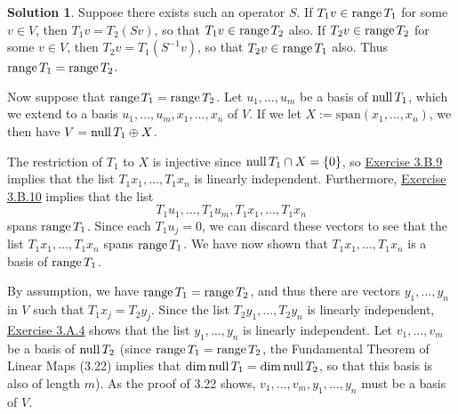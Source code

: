 \documentclass[12pt]{article}
\theoremstyle{definition}
\theoremstyle{exercise}
\theoremstyle{solution}
\newtheorem*{solution}{Solution}
\newcommand{\Span}{\text{span}}
\newcommand{\Null}{\text{null\,}}
\newcommand{\Range}{\text{range\,}}
\begin{document}
\begin{solution}
    Suppose there exists such an operator \( S \). If \( T_1v \in \Range T_1 \) for some \( v \in V \), then \( T_1v = T_2(Sv) \), so that \( T_1v \in \Range T_2 \) also. If \( T_2v \in \Range T_2 \) for some \( v \in V \), then \( T_2v = T_1(S^{-1}v) \), so that \( T_2v \in \Range T_1 \) also. Thus \( \Range T_1 = \Range T_2 \).

    Now suppose that \( \Range T_1 = \Range T_2 \). Let \( u_1, \ldots, u_m \) be a basis of \( \Null T_1 \), which we extend to a basis \( u_1, \ldots, u_m, x_1, \ldots, x_n \) of \( V \). If we let \( X := \Span(x_1, \ldots, x_n) \), we then have \( V = \Null T_1 \oplus X \). 
    
    The restriction of \( T_1 \) to \( X \) is injective since \( \Null T_1 \cap X = \{ 0 \} \), so \href{https://lew98.github.io/Mathematics/LADR_Section_3_B_Exercises.pdf}{Exercise 3.B.9} implies that the list \( T_1 x_1, \ldots, T_1 x_n \) is linearly independent. Furthermore, \href{https://lew98.github.io/Mathematics/LADR_Section_3_B_Exercises.pdf}{Exercise 3.B.10} implies that the list
    \[
        T_1 u_1, \ldots, T_1 u_m, T_1 x_1, \ldots, T_1 x_n
    \]
    spans \( \Range T_1 \). Since each \( T_1 u_j = 0 \), we can discard these vectors to see that the list \( T_1 x_1, \ldots, T_1 x_n \) spans \( \Range T_1 \). We have now shown that \( T_1 x_1, \ldots, T_1 x_n \) is a basis of \( \Range T_1 \).

    By assumption, we have \( \Range T_1 = \Range T_2 \), and thus there are vectors \( y_1, \ldots, y_n \) in \( V \) such that \( T_1 x_j = T_2 y_j \). Since the list \( T_2 y_1, \ldots, T_2 y_n \) is linearly independent, \href{https://lew98.github.io/Mathematics/LADR_Section_3_A_Exercises.pdf}{Exercise 3.A.4} shows that the list \( y_1, \ldots, y_n \) is linearly independent. Let \( v_1, \ldots, v_m \) be a basis of \( \Null T_2 \) (since \( \Range T_1 = \Range T_2 \), the Fundamental Theorem of Linear Maps (3.22) implies that \( \dim \Null T_1 = \dim \Null T_2 \), so that this basis is also of length \( m \)). As the proof of 3.22 shows, \( v_1, \ldots, v_m, y_1, \ldots, y_n \) must be a basis of \( V \).


\end{solution}
\end{document}
